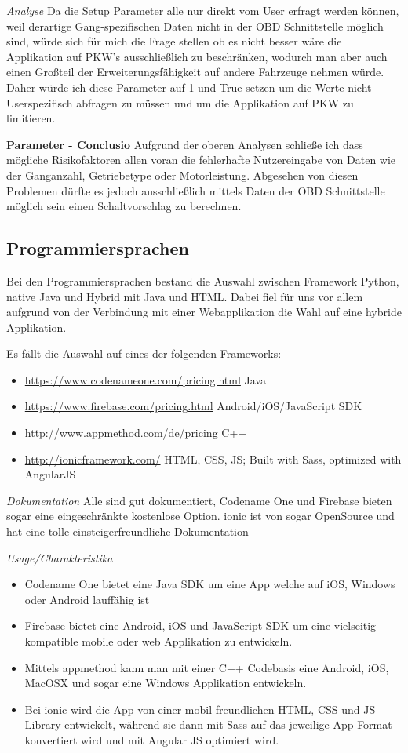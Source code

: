\textit{Analyse}
Da die Setup Parameter alle nur direkt vom User erfragt werden können, weil derartige Gang-spezifischen Daten nicht in der OBD Schnittstelle möglich sind, würde sich für mich die Frage stellen ob es nicht besser wäre die Applikation auf PKW's ausschließlich zu beschränken, wodurch man aber auch einen Großteil der Erweiterungsfähigkeit auf andere Fahrzeuge nehmen würde. Daher würde ich diese Parameter auf 1 und True setzen um die Werte nicht Userspezifisch abfragen zu müssen und um die Applikation auf PKW zu limitieren. 

\textbf{Parameter - Conclusio}
Aufgrund der oberen Analysen schließe ich dass mögliche Risikofaktoren allen voran die fehlerhafte Nutzereingabe von Daten wie der Ganganzahl, Getriebetype oder Motorleistung. Abgesehen von diesen Problemen dürfte es jedoch ausschließlich mittels Daten der OBD Schnittstelle möglich sein einen Schaltvorschlag zu berechnen.


\subsection {Programmiersprachen}
Bei den Programmiersprachen bestand die Auswahl zwischen Framework Python, native Java und Hybrid mit Java und HTML.
Dabei fiel für uns vor allem aufgrund von der Verbindung mit einer Webapplikation die Wahl auf eine hybride Applikation. 

Es fällt die Auswahl auf eines der folgenden Frameworks:
\begin{itemize}
	\item \hyperref[Codename One]{https://www.codenameone.com/pricing.html} Java
	\item \hyperref[Firebase]{https://www.firebase.com/pricing.html} Android/iOS/JavaScript SDK
	\item \hyperref[appmethod]{http://www.appmethod.com/de/pricing} C++
	\item \hyperref[ionic]{http://ionicframework.com/} HTML, CSS, JS; Built with Sass, optimized with AngularJS
\end{itemize}

\textit{Dokumentation}
Alle sind gut dokumentiert, Codename One und Firebase bieten sogar eine eingeschränkte kostenlose Option.
ionic ist von sogar OpenSource und hat eine tolle einsteigerfreundliche Dokumentation

\textit{Usage/Charakteristika}
\begin{itemize}
	\item Codename One bietet eine Java SDK um eine App welche auf iOS, Windows oder Android lauffähig ist
	\item Firebase bietet eine Android, iOS und JavaScript SDK um eine vielseitig kompatible mobile oder web Applikation zu entwickeln. 
	\item Mittels appmethod kann man mit einer C++ Codebasis eine Android, iOS, MacOSX und sogar eine Windows Applikation entwickeln.
	\item Bei ionic wird die App von einer mobil-freundlichen HTML, CSS und JS Library entwickelt, während sie dann mit Sass auf das jeweilige App Format konvertiert wird und mit Angular JS optimiert wird. 
\end{itemize}

